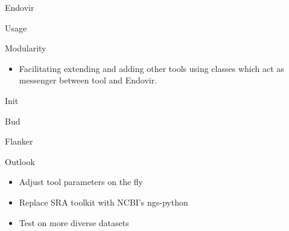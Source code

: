 \documentclass{beamer}
\begin{document}
  \begin{frame}{Endovir}
    \resizebox{\linewidth}{!}{}
  \end{frame}

  \begin{frame}{Usage}
    
  \end{frame}

  \begin{frame}{Modularity}
    \begin{itemize}
     \item Facilitating extending and adding other tools using classes
           which act as messenger between tool and Endovir.
    \end{itemize}
    
  \end{frame}

  \begin{frame}{Init}
    \resizebox{\linewidth}{!}{}
  \end{frame}

  \begin{frame}{Bud}
    \resizebox{\linewidth}{!}{}
  \end{frame}

  \begin{frame}{Flanker}
    
  \end{frame}

  \begin{frame}{Outlook}
    \begin{itemize}
     \item Adjust tool parameters on the fly
     \item Replace SRA toolkit with NCBI's ngs-python
     \item Test on more diverse datasets
    \end{itemize}
  \end{frame}
\end{document}
